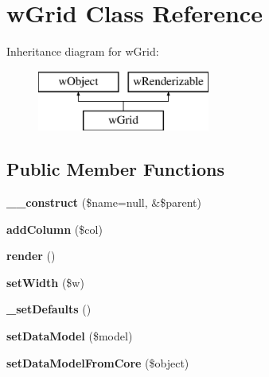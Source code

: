 \hypertarget{classwGrid}{
\section{wGrid Class Reference}
\label{classwGrid}
}
Inheritance diagram for wGrid:\begin{figure}[H]
\begin{center}
\leavevmode
\includegraphics[height=2.000000cm]{classwGrid}
\end{center}
\end{figure}
\subsection*{Public Member Functions}
\begin{DoxyCompactItemize}
\item 
\hypertarget{classwGrid_a1d89d52f6fdeef2554b048e60c4d8dce}{
{\bfseries \_\-\_\-construct} (\$name=null, \&\$parent)}
\label{classwGrid_a1d89d52f6fdeef2554b048e60c4d8dce}

\item 
\hypertarget{classwGrid_a28b78e7e9e0b04ca04567e6730cc3b7a}{
{\bfseries addColumn} (\$col)}
\label{classwGrid_a28b78e7e9e0b04ca04567e6730cc3b7a}

\item 
\hypertarget{classwGrid_a258b2db6ee09caefbbc1b4d0003225c1}{
{\bfseries render} ()}
\label{classwGrid_a258b2db6ee09caefbbc1b4d0003225c1}

\item 
\hypertarget{classwGrid_a6a5f92dceb5d88489946f65899c2c0fa}{
{\bfseries setWidth} (\$w)}
\label{classwGrid_a6a5f92dceb5d88489946f65899c2c0fa}

\item 
\hypertarget{classwGrid_aac676085e3b4ccb59e7ce4f12520407a}{
{\bfseries \_\-setDefaults} ()}
\label{classwGrid_aac676085e3b4ccb59e7ce4f12520407a}

\item 
\hypertarget{classwGrid_a6eb2fb6789b3779a0f7621b3543a84b9}{
{\bfseries setDataModel} (\$model)}
\label{classwGrid_a6eb2fb6789b3779a0f7621b3543a84b9}

\item 
\hypertarget{classwGrid_a994a94498abda48a1a05b1f8b33b5cf5}{
{\bfseries setDataModelFromCore} (\$object)}
\label{classwGrid_a994a94498abda48a1a05b1f8b33b5cf5}

\end{DoxyCompactItemize}
